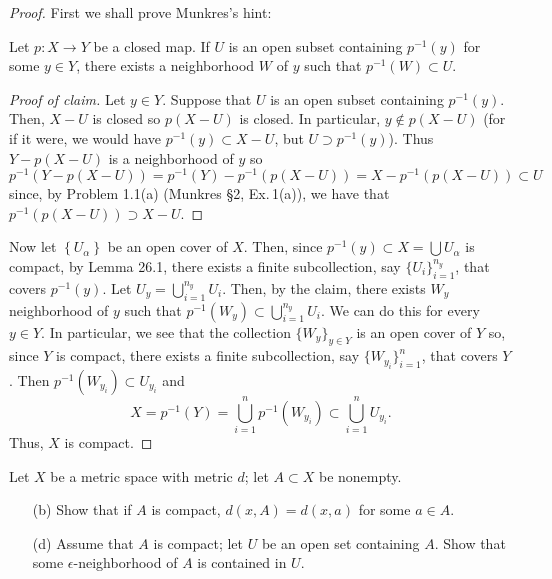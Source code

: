 \begin{proof}
First we shall prove Munkres's hint:
\begin{claim*}
Let $p\colon X\to Y$ be a closed map. If $U$ is an open subset
containing $p^{-1}(y)$ for some $y\in Y$, there exists a neighborhood
$W$ of $y$ such that $p^{-1}(W)\subset U$.
\end{claim*}
\begin{proof}[Proof of claim]
\renewcommand\qedsymbol{$\clubsuit$}
Let $y\in Y$. Suppose that $U$ is an open subset containing
$p^{-1}(y)$. Then, $X-U$ is closed so $p(X-U)$ is closed. In
particular, $y\notin p(X-U)$ (for if it were, we would have
$p^{-1}(y)\subset X-U$, but $U\supset p^{-1}(y)$). Thus $Y-p(X-U)$ is
a neighborhood of $y$ so
\[
p^{-1}(Y-p(X-U))=p^{-1}(Y)-p^{-1}(p(X-U))=X-p^{-1}(p(X-U))\subset U
\]
since, by Problem 1.1(a) (Munkres \S2, Ex.\,1(a)), we have that
$p^{-1}(p(X-U))\supset X-U$.
\end{proof}
Now let $\left\{ U_\alpha \right\}$ be an open cover of $X$. Then,
since $p^{-1}(y)\subset X=\bigcup U_\alpha$ is compact, by Lemma 26.1,
there exists a finite subcollection, say $\{U_i\}_{i=1}^{n_y}$, that
covers $p^{-1}(y)$. Let $U_y=\bigcup_{i=1}^{n_y} U_i$. Then, by the
claim, there exists $W_y$ neighborhood of $y$ such that
$p^{-1}(W_y)\subset\bigcup_{i=1}^{n_y}U_i$. We can do this for every
$y\in Y$. In particular, we see that the collection $\{W_y\}_{y\in Y}$
is an open cover of $Y$ so, since $Y$ is compact, there exists a
finite subcollection, say $\{W_{y_i}\}_{i=1}^n$, that covers $Y$. Then
$p^{-1}(W_{y_i})\subset U_{y_i}$ and
\[
X=p^{-1}(Y)=\bigcup_{i=1}^{n} p^{-1}(W_{y_i})\subset\bigcup_{i=1}^n U_{y_i}.
\]
Thus, $X$ is compact.
\end{proof}
\newpage
\begin{problem}[Munkres \S27, Ex.\,2(b,d)]
Let $X$ be a metric space with metric $d$; let $A\subset X$ be
nonempty.
\begin{itemize}
\item[(b)] Show that if $A$ is compact, $d(x,A)=d(x,a)$ for some
  $a\in A$.
\item[(d)] Assume that $A$ is compact; let $U$ be an open set
  containing $A$. Show that some $\epsilon$-neighborhood of $A$
  is contained in $U$.
\end{itemize}
\end{problem}
